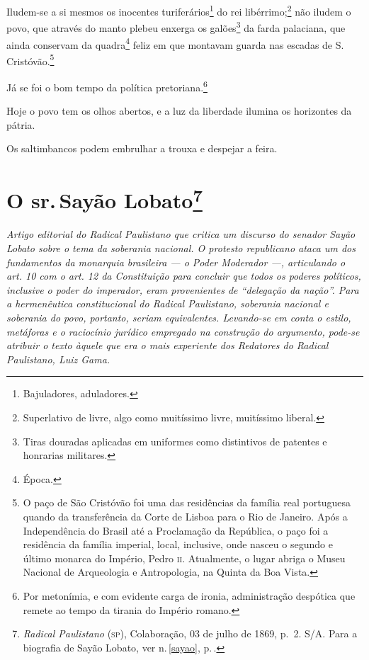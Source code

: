 Iludem-se a si mesmos os inocentes turiferários\footnote{Bajuladores,
  aduladores.} do rei libérrimo;\footnote{Superlativo de livre, algo
  como muitíssimo livre, muitíssimo liberal.} não
iludem o povo, que através do manto plebeu enxerga os galões\footnote{
  Tiras douradas aplicadas em uniformes como distintivos de patentes e
  honrarias militares.} da farda palaciana, que ainda conservam da
quadra\footnote{Época.} feliz em que montavam guarda nas escadas de S.
Cristóvão.\footnote{O paço de São Cristóvão foi uma das residências da
  família real portuguesa quando da transferência da Corte de Lisboa
  para o Rio de Janeiro. Após a Independência do Brasil até a
  Proclamação da República, o paço foi a residência da família imperial,
  local, inclusive, onde nasceu o segundo e último monarca do Império,
  Pedro \textsc{ii}. Atualmente, o lugar abriga o Museu Nacional de Arqueologia e
  Antropologia, na Quinta da Boa Vista.}

Já se foi o bom tempo da política pretoriana.\footnote{Por metonímia, e
  com evidente carga de ironia, administração despótica que remete ao
  tempo da tirania do Império romano.}

Hoje o povo tem os olhos abertos, e a luz da liberdade ilumina os
horizontes da pátria.

Os saltimbancos podem embrulhar a trouxa e despejar a feira.

\chapter{O sr.\,Sayão Lobato\footnote{\emph{Radical Paulistano} (\textsc{sp}),
  Colaboração, 03 de julho de 1869, p.~2. S/A. Para a biografia de Sayão Lobato, ver n.\,\ref{sayao}, p.\,\pageref{sayao}.}}

\begin{didascalia}\itshape
Artigo editorial do \textnormal{Radical Paulistano} que critica um discurso do
senador Sayão Lobato sobre o tema da soberania nacional. O protesto
republicano ataca um dos fundamentos da monarquia brasileira --- o Poder
Moderador ---, articulando o art. 10 com o art. 12 da Constituição para
concluir que todos os poderes políticos, inclusive o poder do imperador,
eram provenientes de ``delegação da nação''. Para a hermenêutica
constitucional do \textnormal{Radical Paulistano}, soberania nacional e
soberania do povo, portanto, seriam equivalentes. Levando-se em conta o
estilo, metáforas e o raciocínio jurídico empregado na construção do
argumento, pode-se atribuir o texto àquele que era o mais experiente dos
Redatores do \textnormal{Radical Paulistano}, Luiz Gama.
\end{didascalia}



